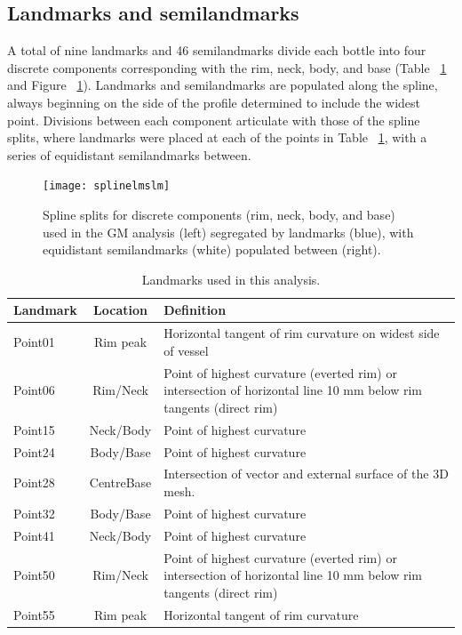\documentclass[review]{elsarticle}
\begin{document}
\subsection{Landmarks and semilandmarks}

A total of nine landmarks and 46 semilandmarks divide each bottle into four discrete components corresponding with the rim, neck, body, and base (Table ~\ref{tab:Tbl3} and Figure ~\ref{fig:spline}). Landmarks and semilandmarks are populated along the spline, always beginning on the side of the profile determined to include the widest point. Divisions between each component articulate with those of the spline splits, where landmarks were placed at each of the points in Table ~\ref{tab:Tbl3}, with a series of equidistant semilandmarks between. 

\begin{figure}[ht]\centering
\texttt{[image: splinelmslm]}
\caption{Spline splits for discrete components (rim, neck, body, and base) used in the GM analysis (left) segregated by landmarks (blue), with equidistant semilandmarks (white) populated between (right).}
\label{fig:spline}
\end{figure}

\begin{table}[htbp]\centering
\footnotesize
\caption{Landmarks used in this analysis.}
\centering
\begin{tabular}{lcp{7.5cm}}
\toprule
Landmark & Location & Definition\\
\midrule
Point01 & Rim peak & Horizontal tangent of rim curvature on widest side of vessel\\
Point06 & Rim/Neck & Point of highest curvature (everted rim) or intersection of horizontal line 10 mm below rim tangents (direct rim)\\
Point15 & Neck/Body & Point of highest curvature\\
Point24 & Body/Base & Point of highest curvature\\
Point28 & CentreBase & Intersection of vector and external surface of the 3D mesh.\\
Point32 & Body/Base & Point of highest curvature\\
Point41 & Neck/Body & Point of highest curvature\\
Point50 & Rim/Neck & Point of highest curvature (everted rim) or intersection of horizontal line 10 mm below rim tangents (direct rim)\\
Point55 & Rim peak & Horizontal tangent of rim curvature\\
\bottomrule
\end{tabular}
\label{tab:Tbl3}
\end{table}
\end{document}
